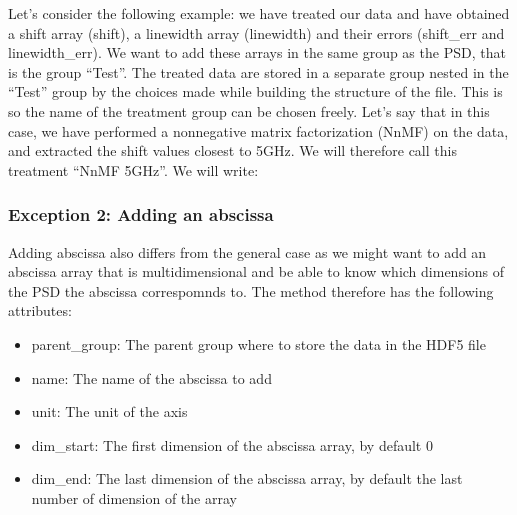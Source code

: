 \documentclass[letterpaper,10pt,english]{sphinxmanual}
\begin{document}
\sphinxAtStartPar
Let’s consider the following example: we have treated our data and have obtained a shift array (shift), a linewidth array (linewidth) and their errors (shift\_err and linewidth\_err). We want to add these arrays in the same group as the PSD, that is the group “Test”. The treated data are stored in a separate group nested in the “Test” group by the choices made while building the structure of the file. This is so the name of the treatment group can be chosen freely. Let’s say that in this case, we have performed a non\sphinxhyphen{}negative matrix factorization (NnMF) on the data, and extracted the shift values closest to 5GHz. We will therefore call this treatment “NnMF \sphinxhyphen{} 5GHz”. We will write:

\begin{sphinxVerbatim}[commandchars=\\\{\}]
  
                       
                       
                       
                       
                       
\end{sphinxVerbatim}


\subsubsection{Exception 2: Adding an abscissa}
\label{\detokenize{source/hdf5_bls_package:exception-2-adding-an-abscissa}}
\sphinxAtStartPar
Adding abscissa also differs from the general case as we might want to add an abscissa array that is multi\sphinxhyphen{}dimensional and be able to know which dimensions of the PSD the abscissa correspomnds to. The  method therefore has the following attributes:
\begin{itemize}
\item {} 
\sphinxAtStartPar
parent\_group: The parent group where to store the data in the HDF5 file

\item {} 
\sphinxAtStartPar
name: The name of the abscissa to add

\item {} 
\sphinxAtStartPar
unit: The unit of the axis

\item {} 
\sphinxAtStartPar
dim\_start: The first dimension of the abscissa array, by default 0

\item {} 
\sphinxAtStartPar
dim\_end: The last dimension of the abscissa array, by default the last number of dimension of the array

\end{itemize}
\end{document}
